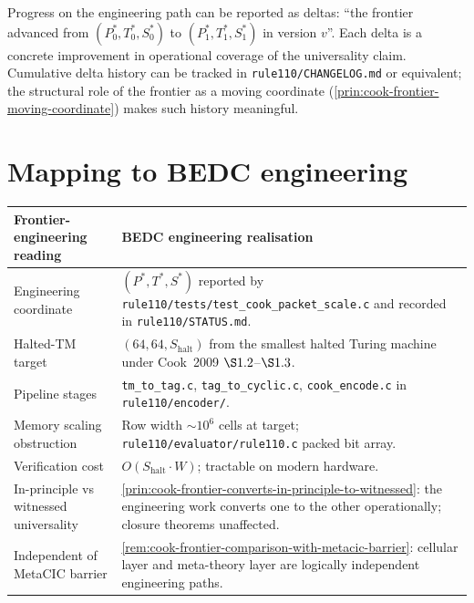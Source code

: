 \begin{remark}
\label{rem:cook-frontier-progress-deltas}
Progress on the engineering path can be reported as deltas: ``the frontier advanced from $(P^*_0, T^*_0, S^*_0)$ to $(P^*_1, T^*_1, S^*_1)$ in version $v$''. Each delta is a concrete improvement in operational coverage of the universality claim. Cumulative delta history can be tracked in \texttt{rule110/CHANGELOG.md} or equivalent; the structural role of the frontier as a moving coordinate (\autoref{prin:cook-frontier-moving-coordinate}) makes such history meaningful.
\end{remark}

\section{Mapping to BEDC engineering}
\label{sec:cook-frontier-mapping-engineering}

\begin{longtable}{p{}p{}}
\toprule
\textbf{Frontier-engineering reading} & \textbf{BEDC engineering realisation} \\
\midrule
Engineering coordinate &
$(P^*, T^*, S^*)$ reported by \texttt{rule110/tests/test\_cook\_packet\_scale.c} and recorded in \texttt{rule110/STATUS.md}. \\
\midrule
Halted-TM target &
$(64, 64, S_{\mathrm{halt}})$ from the smallest halted Turing machine under Cook~2009 \(\S 1.2\)--\(\S 1.3\). \\
\midrule
Pipeline stages &
\texttt{tm\_to\_tag.c}, \texttt{tag\_to\_cyclic.c}, \texttt{cook\_encode.c} in \texttt{rule110/encoder/}. \\
\midrule
Memory scaling obstruction &
Row width $\sim 10^6$ cells at target; \texttt{rule110/evaluator/rule110.c} packed bit array. \\
\midrule
Verification cost &
$O(S_{\mathrm{halt}} \cdot W)$; tractable on modern hardware. \\
\midrule
In-principle vs witnessed universality &
\autoref{prin:cook-frontier-converts-in-principle-to-witnessed}: the engineering work converts one to the other operationally; closure theorems unaffected. \\
\midrule
Independent of MetaCIC barrier &
\autoref{rem:cook-frontier-comparison-with-metacic-barrier}: cellular layer and meta-theory layer are logically independent engineering paths. \\
\bottomrule
\end{longtable}

